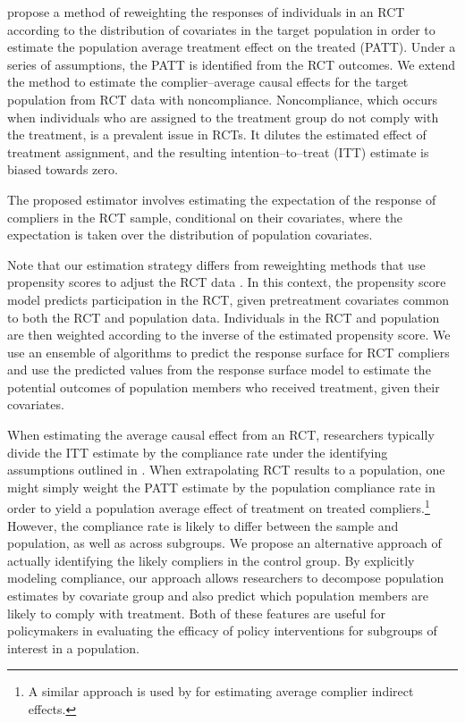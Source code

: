 \documentclass[hidelinks,12pt]{article}
\begin{document}
\citet{Hartman} propose a method of reweighting the responses of individuals in an RCT according to the distribution of covariates in the target population in order to estimate the population average treatment effect on the treated (PATT). Under a series of assumptions, the PATT is identified from the RCT outcomes. {\color{red}We extend the method to estimate the complier--average causal effects for the target population from RCT data with noncompliance.} Noncompliance, which occurs when individuals who are assigned to the treatment group do not comply with the treatment, is a prevalent issue in RCTs. It dilutes the estimated effect of treatment assignment, and the resulting intention--to--treat (ITT) estimate is biased towards zero.

The proposed estimator involves estimating the expectation of the response of compliers in the RCT sample, conditional on their covariates, where the expectation is taken over the distribution of population covariates. {\color{red}Note that our estimation strategy differs from reweighting methods that use propensity scores to adjust the RCT data \citep{stuart2011use}. In this context, the propensity score model predicts participation in the RCT, given pretreatment covariates common to both the RCT and population data. Individuals in the RCT and population are then weighted according to the inverse of the estimated propensity score. We use an ensemble of algorithms to predict the response surface for RCT compliers and use the predicted values from the response surface model to estimate the potential outcomes of population members who received treatment, given their covariates.

When estimating the average causal effect from an RCT, researchers typically divide the ITT estimate by the compliance rate under the identifying assumptions outlined in \citet{Angrist1996}. When extrapolating RCT results to a population, one might simply weight the PATT estimate by the population compliance rate in order to yield a population average effect of treatment on treated compliers.\footnote{A similar approach is used by \cite{imai2013experimental} for estimating average complier indirect effects.} However, the compliance rate is likely to differ between the sample and population, as well as across subgroups. We propose an alternative approach of actually identifying the likely compliers in the control group. By explicitly modeling compliance, our approach allows researchers to decompose population estimates by covariate group and also predict which population members are likely to comply with treatment. Both of these features are useful for policymakers in evaluating the efficacy of policy interventions for subgroups of interest in a population. 
}
\end{document}
